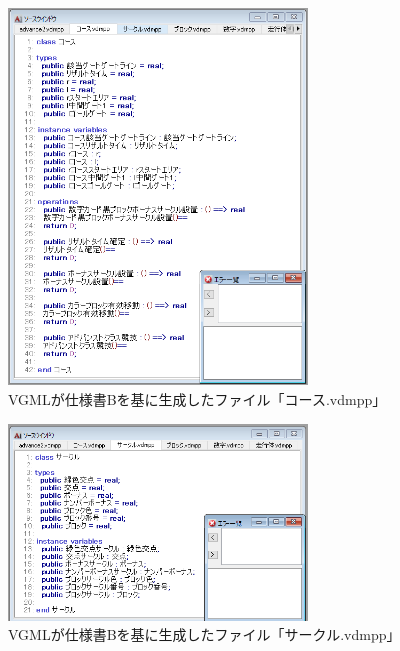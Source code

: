 \begin{figure}[p]
    \begin{center}
    \includegraphics[width=300]{image/indicationB_vdm2.PNG}
    \caption{VGMLが仕様書Bを基に生成したファイル「コース.vdmpp」}
    \label{fig:indicationB_vdm2}
    \end{center}
\end{figure}

\begin{figure}[p]
    \begin{center}
    \includegraphics[width=300]{image/indicationB_vdm3.PNG}
    \caption{VGMLが仕様書Bを基に生成したファイル「サークル.vdmpp」}
    \label{fig:indicationB_vdm3}
    \end{center}
\end{figure}

